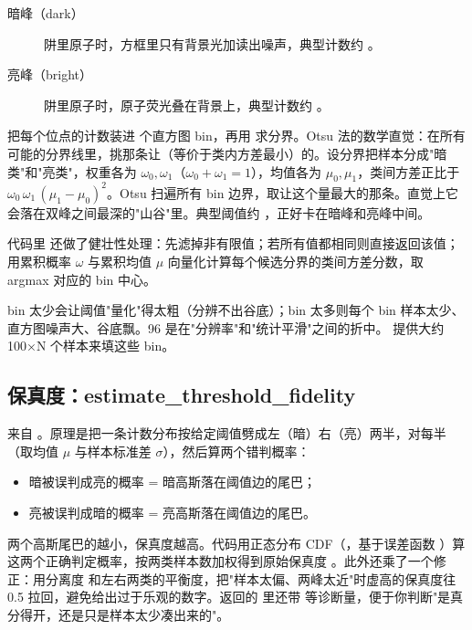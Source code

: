 \documentclass[11pt,oneside,openany]{book}
\begin{document}
\begin{description}
\item[暗峰（dark）] 阱里原子时，方框里只有背景光加读出噪声，典型计数约 。
\item[亮峰（bright）] 阱里原子时，原子荧光叠在背景上，典型计数约 。
\end{description}

把每个位点的计数装进  个直方图 bin，再用  求分界。Otsu 法的数学直觉：在所有可能的分界线里，挑那条让（等价于类内方差最小）的。设分界把样本分成"暗类"和"亮类"，权重各为 $\omega_0, \omega_1$（$\omega_0+\omega_1=1$），均值各为 $\mu_0, \mu_1$，类间方差正比于 $\omega_0\,\omega_1\,(\mu_1-\mu_0)^2$。Otsu 扫遍所有 bin 边界，取让这个量最大的那条。直觉上它会落在双峰之间最深的"山谷"里。典型阈值约 ，正好卡在暗峰和亮峰中间。

代码里  还做了健壮性处理：先滤掉非有限值；若所有值都相同则直接返回该值；用累积概率 $\omega$ 与累积均值 $\mu$ 向量化计算每个候选分界的类间方差分数，取 argmax 对应的 bin 中心。

\begin{notebox}
bin 太少会让阈值"量化"得太粗（分辨不出谷底）；bin 太多则每个 bin 样本太少、直方图噪声大、谷底飘。96 是在"分辨率"和"统计平滑"之间的折中。 提供大约 100×N 个样本来填这些 bin。
\end{notebox}

\subsection{保真度：estimate\_threshold\_fidelity}

 来自 。原理是把一条计数分布按给定阈值劈成左（暗）右（亮）两半，对每半（取均值 $\mu$ 与样本标准差 $\sigma$），然后算两个错判概率：

\begin{itemize}
\item 暗被误判成亮的概率 = 暗高斯落在阈值边的尾巴；
\item 亮被误判成暗的概率 = 亮高斯落在阈值边的尾巴。
\end{itemize}

两个高斯尾巴的越小，保真度越高。代码用正态分布 CDF（，基于误差函数 ）算这两个正确判定概率，按两类样本数加权得到原始保真度 。此外还乘了一个修正：用分离度  和左右两类的平衡度，把"样本太偏、两峰太近"时虚高的保真度往 0.5 拉回，避免给出过于乐观的数字。返回的  里还带  等诊断量，便于你判断"是真分得开，还是只是样本太少凑出来的"。
\end{document}
